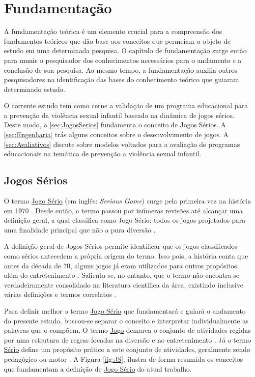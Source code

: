 \chapter{Fundamentação}\label{ch:Fundamentacao}

A fundamentação teórica é um elemento crucial para a compreensão dos fundamentos teóricos que dão base aos conceitos que permeiam o objeto de estudo em uma determinada pesquisa. O capítulo de fundamentação surge então para munir o pesquisador dos conhecimentos necessários para o andamento e a conclusão de sua pesquisa. Ao mesmo tempo, a fundamentação auxilia outros pesquisadores na identificação das bases do conhecimento teórico que guiaram determinado estudo. 

O corrente estudo tem como cerne a validação de um programa educacional para a prevenção da violência sexual infantil baseado na dinâmica de jogos sérios. Deste modo, a \autoref{sec:JogosSerios} fundamenta o conceito de Jogos Sérios. A \autoref{sec:Engenharia} trás alguns conceitos sobre o desenvolvimento de jogos. A \autoref{sec:Avaliativos} discute sobre modelos voltados para a avaliação de programas educacionais na temática de prevenção a violência sexual infantil.


\section{Jogos Sérios}\label{sec:JogosSerios}

O termo \underline{Jo}g\underline{o Sério} (em inglês: \textit{Serious Game}) surge pela primeira vez na história em 1970 \cite{clark1970serious}. Desde então, o termo passou por inúmeras revisões até alcançar uma definição geral, a qual classifica como Jogo Sério: todos os jogos projetados para uma finalidade principal que não a pura diversão \cite{michael2005serious, de2015aprendizagem, laamarti2014overview}.

A definição geral de Jogos Sérios permite identificar que os jogos classificados como sérios antecedem a própria origem do termo. Isso pois, a história conta que antes da década de 70, alguns jogos já eram utilizados para outros propósitos além do entretenimento \cite{wilkinson2016brief}. Salienta-se, no entanto, que o termo não encontra-se verdadeiramente consolidado na literatura científica da área, existindo inclusive várias definições e termos correlatos \cite{pourabdollahian2012serious}.

Para definir melhor o termo \underline{Jo}g\underline{o Sério} que fundamentará e guiará o andamento do presente estudo, buscou-se separar o conceito e interpretar individualmente as palavras que o compõem. O termo \underline{Jo}g\underline{o} demarca o conjunto de atividades regidas por uma estrutura de regras focadas na diversão e no entretenimento \cite{kishimoto1994jogo}. Já o termo \underline{Sério} define um propósito prático a este conjunto de atividades, geralmente sendo pedagógico ou motor \cite{schroeder2017wobu, baptista2017jogos}. %
A Figura \ref{fig:JS}, ilustra de forma resumida os conceitos que fundamentam a definição de \underline{Jo}g\underline{o Sério} do atual trabalho.  

